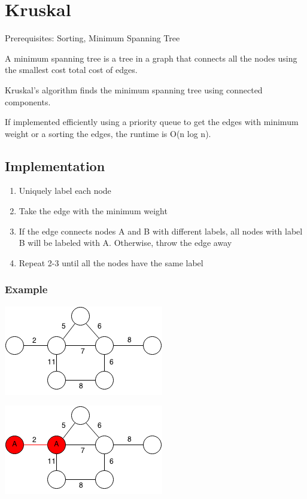 \documentclass[11pt,oneside]{book}
\makeatletter
\def\maxwidth#1{\ifdim\Gin@nat@width>#1 #1\else\Gin@nat@width\fi}
\makeatother
\begin{document}
        \section{ Kruskal }
        

Prerequisites:  Sorting, Minimum Spanning Tree

A minimum spanning tree is a tree in a graph that connects all the nodes using the smallest cost total cost of edges.

Kruskal's algorithm finds the minimum spanning tree using connected components.

If implemented efficiently using a priority queue to get the edges with minimum weight or a sorting the edges, the runtime is O(n log n).

\subsection{Implementation}

\begin{enumerate}
\item Uniquely label each node
\item Take the edge with the minimum weight
\item If the edge connects nodes A and B with different labels, all nodes with label B will be labeled with A. Otherwise, throw the edge away
\item Repeat 2-3 until all the nodes have the same label
\end{enumerate}

\subsubsection{Example}

\includegraphics[width=\maxwidth{\textwidth}]{kruskal.png}

\includegraphics[width=\maxwidth{\textwidth}]{kruskal2.png}
\end{document}
